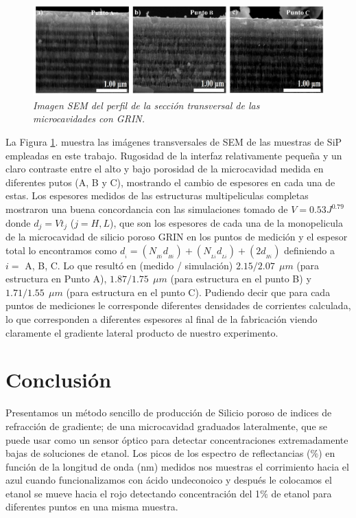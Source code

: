 \documentclass[a4paper,11pt,]{book}
\begin{document}
\begin{figure}[H]
	\centering
	\includegraphics[scale=.3]{../Images/MCSEMSE1}
	\caption{\emph{Imagen SEM del perfil de la sección transversal de las microcavidades con GRIN.}}
	\label{fig:MCGRIN9}
\end{figure}
La Figura \ref{fig:MCGRIN9}. muestra las imágenes transversales de SEM de las muestras de SiP empleadas en este trabajo. Rugosidad de la interfaz relativamente pequeña y un claro contraste entre el alto y bajo porosidad  de la microcavidad medida en diferentes putos (A, B y C), mostrando el cambio de espesores en cada una de estas. 
Los espesores medidos de las estructuras multipeliculas completas mostraron una buena concordancia con las  simulaciones tomado de $V=0.53J^{0.79}$ donde $d_j=Vt_j$ ($j=H,L$), que son los espesores de cada una de la monopelicula de la microcavidad de silicio poroso GRIN en los puntos de medición y el espesor total  lo encontramos como  $d_{_{i}} = (N_{_{Hi}}d_{_{Hi}})+(N_{_{Li}}d_{_{Li}}) + (2d_{_{Hi}})$  definiendo a $i=$ A, B, C. Lo que resultó en (medido / simulación) $2.15 / 2.07 \ \ \mu m $ (para estructura en Punto A), $1.87 / 1.75 \ \ \mu m $ (para estructura en el punto B) y $1.71 / 1.55 \ \ \mu m $ (para estructura  en el punto C). Pudiendo decir que para cada puntos de mediciones le corresponde diferentes densidades de corrientes calculada, lo que corresponden a diferentes espesores al final de la fabricación viendo claramente el gradiente lateral producto de nuestro experimento.
\section{Conclusión}
Presentamos un método sencillo de producción de Silicio poroso de indices de refracción de gradiente; de una microcavidad  graduados lateralmente, que se  puede usar como un sensor óptico para detectar concentraciones extremadamente bajas de soluciones de etanol. Los picos de los espectro de reflectancias ($\%$) en función de la longitud de onda (nm) medidos nos muestras el corrimiento hacia el azul cuando funcionalizamos con ácido undeconoico y después le colocamos el etanol se mueve hacia el rojo detectando concentración del 1$\%$ de etanol para diferentes puntos en una misma muestra. 
\end{document}
